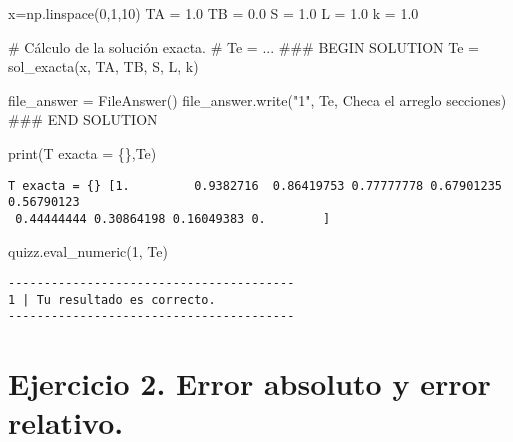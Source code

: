 \documentclass[
  letterpaper,
  DIV=11,
  numbers=noendperiod]{scrreprt}
\newenvironment{Shaded}{\begin{snugshade}}{\end{snugshade}}
\newcommand{\BuiltInTok}[1]{\textcolor[rgb]{0.00,0.23,0.31}{#1}}
\newcommand{\CommentTok}[1]{\textcolor[rgb]{0.37,0.37,0.37}{#1}}
\newcommand{\DecValTok}[1]{\textcolor[rgb]{0.68,0.00,0.00}{#1}}
\newcommand{\FloatTok}[1]{\textcolor[rgb]{0.68,0.00,0.00}{#1}}
\newcommand{\NormalTok}[1]{\textcolor[rgb]{0.00,0.23,0.31}{#1}}
\newcommand{\OperatorTok}[1]{\textcolor[rgb]{0.37,0.37,0.37}{#1}}
\newcommand{\RegionMarkerTok}[1]{\textcolor[rgb]{0.00,0.23,0.31}{#1}}
\newcommand{\SpecialCharTok}[1]{\textcolor[rgb]{0.37,0.37,0.37}{#1}}
\newcommand{\StringTok}[1]{\textcolor[rgb]{0.13,0.47,0.30}{#1}}
\begin{document}
\begin{Shaded}
\begin{Highlighting}[]
\NormalTok{x}\OperatorTok{=}\NormalTok{np.linspace(}\DecValTok{0}\NormalTok{,}\DecValTok{1}\NormalTok{,}\DecValTok{10}\NormalTok{)}
\NormalTok{TA }\OperatorTok{=} \FloatTok{1.0}
\NormalTok{TB }\OperatorTok{=} \FloatTok{0.0}
\NormalTok{S }\OperatorTok{=} \FloatTok{1.0}
\NormalTok{L }\OperatorTok{=} \FloatTok{1.0}
\NormalTok{k }\OperatorTok{=} \FloatTok{1.0}

\CommentTok{\# Cálculo de la solución exacta.}
\CommentTok{\# Te = ...}
\CommentTok{\#\#\# }\RegionMarkerTok{BEGIN}\CommentTok{ SOLUTION}
\NormalTok{Te }\OperatorTok{=}\NormalTok{ sol\_exacta(x, TA, TB, S, L, k)}

\NormalTok{file\_answer }\OperatorTok{=}\NormalTok{ FileAnswer()}
\NormalTok{file\_answer.write(}\StringTok{"1"}\NormalTok{, Te, }\StringTok{\textquotesingle{}Checa el arreglo secciones\textquotesingle{}}\NormalTok{)}
\CommentTok{\#\#\# }\RegionMarkerTok{END}\CommentTok{ SOLUTION}

\BuiltInTok{print}\NormalTok{(}\StringTok{\textquotesingle{}T exacta = }\SpecialCharTok{\{\}}\StringTok{\textquotesingle{}}\NormalTok{,Te)}
\end{Highlighting}
\end{Shaded}

\begin{verbatim}
T exacta = {} [1.         0.9382716  0.86419753 0.77777778 0.67901235 0.56790123
 0.44444444 0.30864198 0.16049383 0.        ]
\end{verbatim}

\begin{Shaded}
\begin{Highlighting}[]
\NormalTok{quizz.eval\_numeric(}\StringTok{\textquotesingle{}1\textquotesingle{}}\NormalTok{, Te)}
\end{Highlighting}
\end{Shaded}

\begin{verbatim}
----------------------------------------
1 | Tu resultado es correcto.
----------------------------------------
\end{verbatim}

\section{Ejercicio 2. Error absoluto y error
relativo.}\label{ejercicio-2.-error-absoluto-y-error-relativo.}
\end{document}
